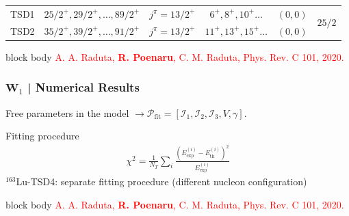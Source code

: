 \documentclass{beamer}
\begin{document}
\begin{frame}
\begin{table}
{\begin{tabular}{cccccc}
			TSD1 & $25/2^+,29/2^+,\dots,89/2^+$ & $j^\pi=13/2^+$  & $6^+,8^+,10^+\dots$   & $(0,0)$             & \multirow{2}{*}{$25/2$} \\ \cline{1-5}
			TSD2 & $35/2^+,39/2^+,\dots,91/2^+$ & $j^\pi=13/2^+$  & $11^+,13^+,15^+\dots$ & $(0,0)$             &                         \\ \hline
		\end{tabular}%
		}
		\label{lu-167-experimental-data-table}
	\end{table}
	\begin{beamercolorbox}[rounded=true,shadow=false, wd=\linewidth,]{block body}
		\centering
		\textcolor{red}{\footnotesize{A. A. Raduta, \textbf{R. Poenaru}, C. M. Raduta, Phys. Rev. C 101, 2020.}}
	\end{beamercolorbox}
\end{frame}

\begin{frame}
	\frametitle{$\mathbf{W}_1$ | Numerical Results}
	Free parameters in the model $\rightarrow\mathcal{P}_\text{fit}=\left[\mathcal{I}_1,\mathcal{I}_2,\mathcal{I}_3,V,\gamma\right]$.
	\begin{block}{Fitting procedure}
		\vspace{-0.4cm}
		\begin{align}
			\chi^2=\frac{1}{N_T}\sum_i\frac{\left(E_\text{exp}^{(i)}-E_\text{th}^{(i)}\right)^2}{E_\text{exp}^{(i)}}\nonumber
		\end{align}
		$^{163}$Lu-TSD4: separate fitting procedure (different nucleon configuration)
	\end{block}
	\begin{table}
		\centering
	\end{table}
	\begin{beamercolorbox}[rounded=true,shadow=false, wd=\linewidth,]{block body}
		\centering
		\textcolor{red}{\footnotesize{A. A. Raduta, \textbf{R. Poenaru}, C. M. Raduta, Phys. Rev. C 101, 2020.}}
	\end{beamercolorbox}
\end{frame}
\end{document}
